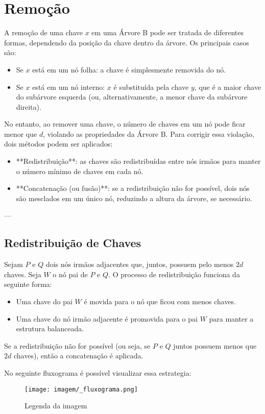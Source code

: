 \section{Remoção}

A remoção de uma chave \( x \) em uma Árvore B pode ser tratada de diferentes formas, 
dependendo da posição da chave dentro da árvore. Os principais casos são:

\begin{itemize}
    \item Se \( x \) está em um nó folha: a chave é simplesmente removida do nó.
    \item Se \( x \) está em um nó interno: \( x \) é substituída pela chave \( y \), que é 
    a maior chave do subárvore esquerda (ou, alternativamente, a menor chave da subárvore direita).
\end{itemize}

No entanto, ao remover uma chave, o número de chaves em um nó pode ficar menor que \( d \), 
violando as propriedades da Árvore B. Para corrigir essa violação, dois métodos podem ser aplicados:

\begin{itemize}
    \item **Redistribuição**: as chaves são redistribuídas entre nós irmãos para manter o número 
    mínimo de chaves em cada nó.
    \item **Concatenação (ou fusão)**: se a redistribuição não for possível, dois nós são mesclados 
    em um único nó, reduzindo a altura da árvore, se necessário.
\end{itemize}

---

\subsection{Redistribuição de Chaves}

Sejam \( P \) e \( Q \) dois nós irmãos adjacentes que, juntos, possuem pelo menos \( 2d \) chaves. 
Seja \( W \) o nó pai de \( P \) e \( Q \). O processo de redistribuição funciona da seguinte forma:

\begin{itemize}
    \item Uma chave do pai \( W \) é movida para o nó que ficou com menos chaves.
    \item Uma chave do nó irmão adjacente é promovida para o pai \( W \) para manter a estrutura balanceada.
\end{itemize}

Se a redistribuição não for possível (ou seja, se \( P \) e \( Q \) juntos possuem menos que \( 2d \) chaves), então a concatenação é aplicada.

No seguinte fluxograma é possível visualizar essa estrategia:

\begin{figure}[h]
    \centering
    \texttt{[image: imagem/\_fluxograma.png]}
    \caption{Legenda da imagem}
    \label{fig:exemplo}
\end{figure}
